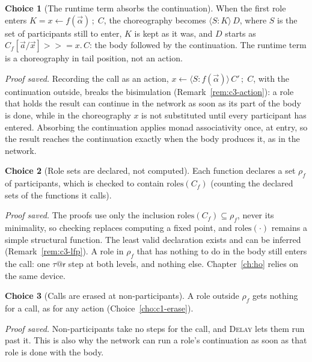 \documentclass[11pt]{report}
\makeatletter
\theoremstyle{plain}
\theoremstyle{definition}
\newtheorem{choice}{Choice}[chapter]
\theoremstyle{remark}
\newcommand{\rr}{\mathsf{r}}
\newcommand{\bind}[3]{#1 \leftarrow #2\,;\;#3}
\newcommand{\mbind}[3]{#1 \mathbin{>\!\!>\!\!=} #2.\,#3}
\newcommand{\rt}[3]{\langle #1 : #2\rangle\,#3}
\newcommand{\roles}[1]{\mathrm{roles}(#1)}
\newcommand{\tauat}[1]{\tau\mathord{@}#1}
\newcommand{\rn}[1]{{\normalfont\scshape #1}}
\makeatother
\begin{document}
\begin{choice}[The runtime term absorbs the continuation]\label{cho:c3-absorb}
  When the first role enters $K=\bind{x}{f(\vec\alpha)}{C}$, the choreography
  becomes $\rt{S}{K}{D}$, where $S$ is the set of participants still to
  enter, $K$ is kept as it was, and $D$ starts as
  $\mbind{C_f[\vec a/\vec x]}{x}{C}$: the body followed by the continuation.
  The runtime term is a choreography in tail position, not an action.

  \emph{Proof saved.}  Recording the call as an action,
  $\bind{x}{\rt{S}{f(\vec\alpha)}{C'}}{C}$, with the continuation outside,
  breaks the bisimulation (Remark~\ref{rem:c3-action}): a role that holds
  the result can continue in the network as soon as its part of the body is
  done, while in the choreography $x$ is not substituted until every
  participant has entered.  Absorbing the continuation applies monad
  associativity once, at entry, so the result reaches the continuation
  exactly when the body produces it, as in the network.
\end{choice}

\begin{choice}[Role sets are declared, not computed]\label{cho:c3-rho}
  Each function declares a set $\rho_f$ of participants, which is checked to
  contain $\roles{C_f}$ (counting the declared sets of the functions it
  calls).

  \emph{Proof saved.}  The proofs use only the inclusion
  $\roles{C_f}\subseteq\rho_f$, never its minimality, so checking replaces
  computing a fixed point, and $\roles{\cdot}$ remains a simple structural
  function.  The least valid declaration exists and can be inferred
  (Remark~\ref{rem:c3-lfp}).  A role in $\rho_f$ that has nothing to do in the
  body still enters the call: one $\tauat{\rr}$ step at both levels, and
  nothing else.  Chapter~\ref{ch:ho} relies on the same device.
\end{choice}

\begin{choice}[Calls are erased at non-participants]\label{cho:c3-erase}
  A role outside $\rho_f$ gets nothing for a call, as for any action
  (Choice~\ref{cho:c1-erase}).

  \emph{Proof saved.}  Non-participants take no steps for the call, and
  \rn{Delay} lets them run past it.  This is also why the network can run a
  role's continuation as soon as that role is done with the body.
\end{choice}
\end{document}
